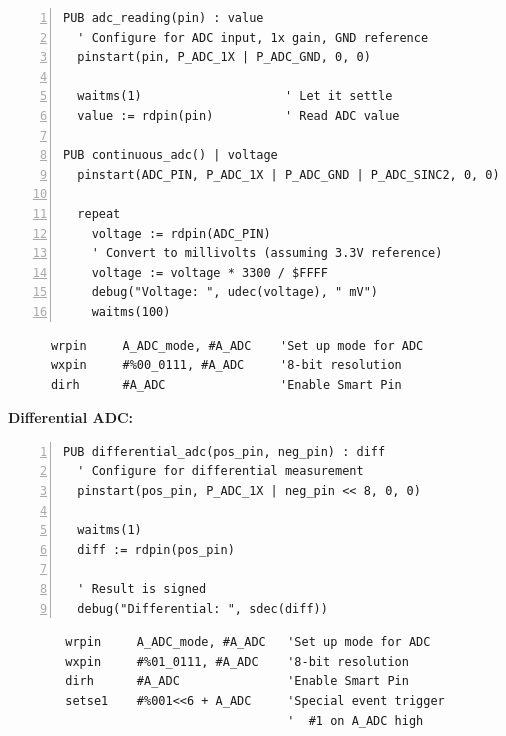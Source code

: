 \documentclass[11pt,a4paper,oneside,english]{book}
\begin{document}
\begin{Spin2Block}
\begin{Verbatim}[numbers=left,numbersep=5pt,xleftmargin=15pt]
PUB adc_reading(pin) : value
  ' Configure for ADC input, 1x gain, GND reference
  pinstart(pin, P_ADC_1X | P_ADC_GND, 0, 0)
  
  waitms(1)                    ' Let it settle
  value := rdpin(pin)          ' Read ADC value
  
PUB continuous_adc() | voltage
  pinstart(ADC_PIN, P_ADC_1X | P_ADC_GND | P_ADC_SINC2, 0, 0)
  
  repeat
    voltage := rdpin(ADC_PIN)
    ' Convert to millivolts (assuming 3.3V reference)
    voltage := voltage * 3300 / $FFFF
    debug("Voltage: ", udec(voltage), " mV")
    waitms(100)
\end{Verbatim}
\end{Spin2Block}

\begin{PASM2Block}
\begin{lstlisting}
      wrpin     A_ADC_mode, #A_ADC    'Set up mode for ADC
      wxpin     #%00_0111, #A_ADC     '8-bit resolution
      dirh      #A_ADC                'Enable Smart Pin
\end{lstlisting}
\end{PASM2Block}

\textbf{Differential ADC:}

\begin{Spin2Block}
\begin{Verbatim}[numbers=left,numbersep=5pt,xleftmargin=15pt]
PUB differential_adc(pos_pin, neg_pin) : diff
  ' Configure for differential measurement
  pinstart(pos_pin, P_ADC_1X | neg_pin << 8, 0, 0)
  
  waitms(1)
  diff := rdpin(pos_pin)
  
  ' Result is signed
  debug("Differential: ", sdec(diff))
\end{Verbatim}
\end{Spin2Block}

\begin{PASM2Block}
\begin{lstlisting}
        wrpin     A_ADC_mode, #A_ADC   'Set up mode for ADC
        wxpin     #%01_0111, #A_ADC    '8-bit resolution
        dirh      #A_ADC               'Enable Smart Pin
        setse1    #%001<<6 + A_ADC     'Special event trigger
                                       '  #1 on A_ADC high
\end{lstlisting}
\end{PASM2Block}
\end{document}
